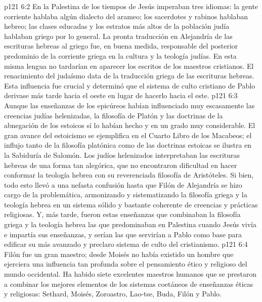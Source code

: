 \vs p121 6:2 En la Palestina de los tiempos de Jesús imperaban tres idiomas: la gente corriente hablaba algún dialecto del arameo; los sacerdotes y rabinos hablaban hebreo; las clases educadas y los estratos más altos de la población judía hablaban griego por lo general. La pronta traducción en Alejandría de las escrituras hebreas al griego fue, en buena medida, responsable del posterior predominio de la corriente griega en la cultura y la teología judías. En esta misma lengua no tardarían en aparecer los escritos de los maestros cristianos. El renacimiento del judaísmo data de la traducción griega de las escrituras hebreas. Esta influencia fue crucial y determinó que el sistema de culto cristiano de Pablo derivase más tarde hacia el oeste en lugar de hacerlo hacia el este.
\vs p121 6:3 Aunque las enseñanzas de los epicúreos habían influenciado muy escasamente las creencias judías helenizadas, la filosofía de Platón y las doctrinas de la abnegación de los estoicos sí lo habían hecho y en un grado muy considerable. El gran avance del estoicismo se ejemplifica en el Cuarto Libro de los Macabeos; el influjo tanto de la filosofía platónica como de las doctrinas estoicas se ilustra en la Sabiduría de Salomón. Los judíos helenizados interpretaban las escrituras hebreas de una forma tan alegórica, que no encontraron dificultad en hacer conformar la teología hebrea con su reverenciada filosofía de Aristóteles. Si bien, todo esto llevó a una nefasta confusión hasta que Filón de Alejandría se hizo cargo de la problemática, armonizando y sistematizando la filosofía griega y la teología hebrea en un sistema sólido y bastante coherente de creencias y prácticas religiosas. Y, más tarde, fueron estas enseñanzas que combinaban la filosofía griega y la teología hebrea las que predominaban en Palestina cuando Jesús vivía e impartía sus enseñanzas, y serían las que servirían a Pablo como base para edificar su más avanzado y preclaro sistema de culto del cristianismo.
\vs p121 6:4 Filón fue un gran maestro; desde Moisés no había existido un hombre que ejerciera una influencia tan profunda sobre el pensamiento ético y religioso del mundo occidental. Ha habido siete excelentes maestros humanos que se prestaron a combinar los mejores elementos de los sistemas coetáneos de enseñanzas éticas y religiosas: Sethard, Moisés, Zoroastro, Lao\hyp{}tse, Buda, Filón y Pablo.
